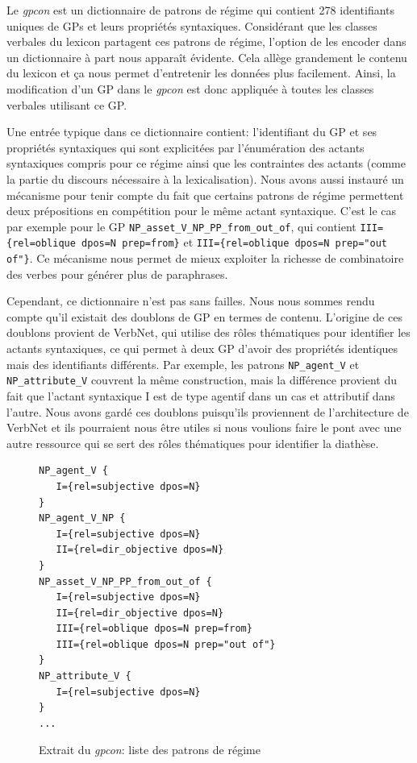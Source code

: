 Le \emph{gpcon} est un dictionnaire de patrons de régime qui contient 278 identifiants uniques de \acp{GP} et leurs propriétés syntaxiques. Considérant que les classes verbales du lexicon partagent ces patrons de régime, l'option de les encoder dans un dictionnaire à part nous apparaît évidente. Cela allège grandement le contenu du lexicon et ça nous permet d'entretenir les données plus facilement. Ainsi, la modification d'un \ac{GP} dans le \emph{gpcon} est donc appliquée à toutes les classes verbales utilisant ce \ac{GP}. 

Une entrée typique dans ce dictionnaire contient: l'identifiant du \ac{GP} et ses propriétés syntaxiques qui sont explicitées par l'énumération des actants syntaxiques compris pour ce régime ainsi que les contraintes des actants (comme la partie du discours nécessaire à la lexicalisation). Nous avons aussi instauré un mécanisme pour tenir compte du fait que certains patrons de régime permettent deux prépositions en compétition pour le même actant syntaxique. C'est le cas par exemple pour le \ac{GP} \texttt{NP\_asset\_V\_NP\_PP\_from\_out\_of}, qui contient \lstinline|III={rel=oblique dpos=N prep=from}| et \lstinline|III={rel=oblique dpos=N prep="out of"}|. Ce mécanisme nous permet de mieux exploiter la richesse de combinatoire des verbes pour générer plus de paraphrases.

Cependant, ce dictionnaire n'est pas sans failles. Nous nous sommes rendu compte qu'il existait des doublons de \ac{GP} en termes de contenu. L'origine de ces doublons provient de VerbNet, qui utilise des rôles thématiques pour identifier les actants syntaxiques, ce qui permet à deux \ac{GP} d'avoir des propriétés identiques mais des identifiants différents. Par exemple, les patrons \texttt{NP\_agent\_V} et \texttt{NP\_attribute\_V} couvrent la même construction, mais la différence provient du fait que l'actant syntaxique I est de type agentif dans un cas et attributif dans l'autre. Nous avons gardé ces doublons puisqu'ils proviennent de l'architecture de VerbNet et ils pourraient nous être utiles si nous voulions faire le pont avec une autre ressource qui se sert des rôles thématiques pour identifier la diathèse.

\begin{figure}[htb]
  \caption{Extrait du \emph{gpcon}: liste des patrons de régime}
	\label{fig:4entries-gpcon}
\begin{lstlisting}[language=mate]
NP_agent_V {
   I={rel=subjective dpos=N}
}
NP_agent_V_NP {
   I={rel=subjective dpos=N}
   II={rel=dir_objective dpos=N}
}
NP_asset_V_NP_PP_from_out_of {
   I={rel=subjective dpos=N}
   II={rel=dir_objective dpos=N}
   III={rel=oblique dpos=N prep=from}
   III={rel=oblique dpos=N prep="out of"}
}
NP_attribute_V {
   I={rel=subjective dpos=N}
}
...
\end{lstlisting}
\end{figure}

